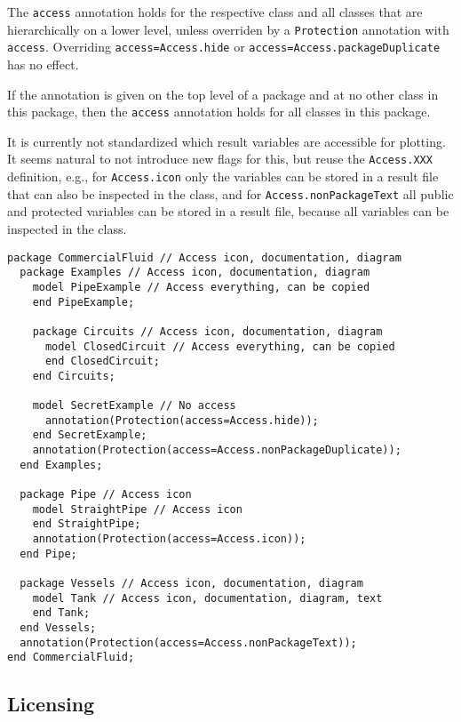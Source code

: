 The \lstinline!access! annotation holds for the respective class and all classes
that are hierarchically on a lower level, unless overriden by a
\lstinline!Protection! annotation with \lstinline!access!.
Overriding \lstinline!access=Access.hide! or \lstinline!access=Access.packageDuplicate!
has no effect.

\begin{example}
If the annotation is given on the top level of a package and at no other class in this
package, then the \lstinline!access! annotation holds for all classes in this package.
\end{example}


\begin{nonnormative}
It is currently not standardized which result variables are
accessible for plotting. It seems natural to not introduce new flags for
this, but reuse the \lstinline!Access.XXX! definition, e.g., for \lstinline!Access.icon!
only the variables can be stored in a result file that can also be
inspected in the class, and for \lstinline!Access.nonPackageText! all public
and protected variables can be stored in a result file, because all
variables can be inspected in the class.

\begin{lstlisting}[language=modelica]
package CommercialFluid // Access icon, documentation, diagram
  package Examples // Access icon, documentation, diagram
    model PipeExample // Access everything, can be copied
    end PipeExample;

    package Circuits // Access icon, documentation, diagram
      model ClosedCircuit // Access everything, can be copied
      end ClosedCircuit;
    end Circuits;

    model SecretExample // No access
      annotation(Protection(access=Access.hide));
    end SecretExample;
    annotation(Protection(access=Access.nonPackageDuplicate));
  end Examples;

  package Pipe // Access icon
    model StraightPipe // Access icon
    end StraightPipe;
    annotation(Protection(access=Access.icon));
  end Pipe;

  package Vessels // Access icon, documentation, diagram
    model Tank // Access icon, documentation, diagram, text
    end Tank;
  end Vessels;
  annotation(Protection(access=Access.nonPackageText));
end CommercialFluid;
\end{lstlisting}
\end{nonnormative}

\subsection{Licensing}\label{licensing}

